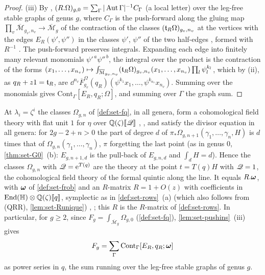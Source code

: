 \begin{proof}
(iii) By \cite[Defs.~2.2, 2.13]{PPZ15}, $(R.\Omega)_{g,0}=\sum_\Gamma|\operatorname{Aut}\Gamma|^{-1}C_\Gamma$ (a local letter) over the leg-free stable graphs of genus $g$, where $C_\Gamma$ is the push-forward along the gluing map $\prod_v\overline{\mathcal M}_{g_v,n_v}\to\overline{\mathcal M}_g$ \cite[\S0.2, (1)]{PPZ15} of the contraction of the classes $(\mathfrak{t}_R\Omega)_{g_v,n_v}$ at the vertices with the edges $E_R(\psi',\psi'')$ in the classes $\psi'$, $\psi''$ of the two half-edges \cite[Def.~2.2~(iii)]{PPZ15}, formed with $R^{-1}$ \cite[p.~20]{PPZ15}. The push-forward preserves integrals. Expanding each edge into finitely many relevant monomials $\psi'^{\,a}\psi''^{\,b}$, the integral over the product is the contraction of the forms $(x_1,\dots,x_{n_v})\mapsto\int_{\overline{\mathcal M}_{g_v,n_v}}(\mathfrak{t}_R\Omega)_{g_v,n_v}(x_1,\dots,x_{n_v})\prod_l\psi_l^{k_l}$, which by (ii), as $q_R+z1=\mathfrak{t}_R$, are $\dd^{n_v}\overline F^\Omega_{g_v}(q_R)(\psi^{k_1}x_1,\dots,\psi^{k_{n_v}}x_{n_v})$. Summing over the monomials gives $\mathrm{Cont}_\Gamma[E_R,q_R;\Omega]$, and summing over $\Gamma$ the graph sum.
\end{proof}

\begin{thm}
\label{thm:set-GT}
At $\lambda_i=\zeta^i$ the classes $\Omega_{g,n}$ of \cref{def:set-fq}, in all genera, form a cohomological field theory with flat unit $1$ for $\eta$ over $\mathbb{Q}(\zeta)[\![ \mathscr{Q} ]\!]$ \cite[Section~4.1]{GJR18}, \cite[Def.~0.3]{PPZ15}, and satisfy the divisor equation in all genera: for $2g-2+n>0$ the part of degree $d$ of $\pi_*\Omega_{g,n+1}(\gamma_1,\dots,\gamma_n,H)$ is $d$ times that of $\Omega_{g,n}(\gamma_1,\dots,\gamma_n)$, $\pi$ forgetting the last point (as in genus $0$, \cref{thm:set-G0}~(b): $E_{g,n+1,d}$ is the pull-back of $E_{g,n,d}$ and $\int_dH=d$). Hence the classes $\Omega_{g,n}$ with $\mathscr{Q}=\mathrm{e}^{T(q)}$ are the theory at the point $t=T(q)H$ with $\mathscr{Q}=1$, the cohomological field theory of the formal quintic along the line. It equals $R.\boldsymbol{\omega}$, with $\boldsymbol{\omega}$ of \cref{def:set-frob} and an $R$-matrix $R=1+O(z)$ with coefficients in $\operatorname{End}(\mathbb{H})\otimes\mathbb{Q}(\zeta)[\![ q ]\!]$, symplectic as in \cref{def:set-rows}~(a) (which also follows from (QRR), \cref{lem:set-Runique}) \cite[Theorem~(2) in (1.15)]{MR2917177}, \cite[Section~4.1, Theorem~4.1]{GJR18}; this $R$ is the $R$-matrix of \cref{def:set-rows}. In particular, for $g\geq2$, since $F_g=\int_{\overline{\mathcal M}_g}\Omega_{g,0}$ (\cref{def:set-fq}), \cref{lem:set-pushins}~(iii) gives
\[
F_g=\sum_\Gamma\mathrm{Cont}_\Gamma[E_R,q_R;\boldsymbol{\omega}]
\]
as power series in $q$, the sum running over the leg-free stable graphs of genus $g$.
\end{thm}


